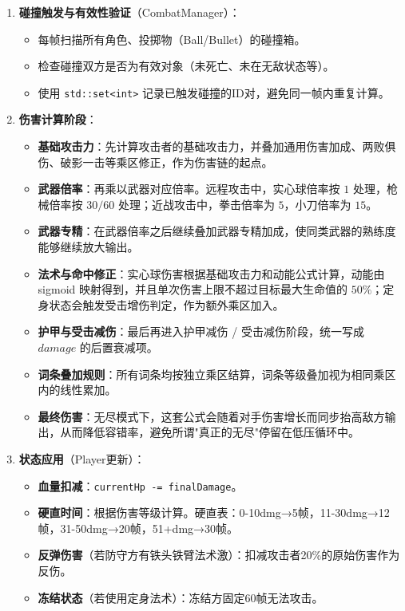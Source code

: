 ﻿\documentclass[utf8]{ctexart}
\begin{document}
\begin{enumerate}
  \item \textbf{碰撞触发与有效性验证}（CombatManager）：
  \begin{itemize}
    \item 每帧扫描所有角色、投掷物（Ball/Bullet）的碰撞箱。
    \item 检查碰撞双方是否为有效对象（未死亡、未在无敌状态等）。
    \item 使用 \texttt{std::set<int>} 记录已触发碰撞的ID对，避免同一帧内重复计算。
  \end{itemize}

  \item \textbf{伤害计算阶段}：
  \begin{itemize}
    \item \textbf{基础攻击力}：先计算攻击者的基础攻击力，并叠加通用伤害加成、两败俱伤、破影一击等乘区修正，作为伤害链的起点。
    \item \textbf{武器倍率}：再乘以武器对应倍率。远程攻击中，实心球倍率按 $1$ 处理，枪械倍率按 $30/60$ 处理；近战攻击中，拳击倍率为 $5$，小刀倍率为 $15$。
    \item \textbf{武器专精}：在武器倍率之后继续叠加武器专精加成，使同类武器的熟练度能够继续放大输出。
    \item \textbf{法术与命中修正}：实心球伤害根据基础攻击力和动能公式计算，动能由 sigmoid 映射得到，并且单次伤害上限不超过目标最大生命值的 $50\%$；定身状态会触发受击增伤判定，作为额外乘区加入。
    \item \textbf{护甲与受击减伤}：最后再进入护甲减伤 / 受击减伤阶段，统一写成 $damage$ 的后置衰减项。
    \item \textbf{词条叠加规则}：所有词条均按独立乘区结算，词条等级叠加视为相同乘区内的线性累加。
    \item \textbf{最终伤害}：无尽模式下，这套公式会随着对手伤害增长而同步抬高敌方输出，从而降低容错率，避免所谓"真正的无尽"停留在低压循环中。
  \end{itemize}

  \item \textbf{状态应用}（Player更新）：
  \begin{itemize}
    \item \textbf{血量扣减}：\texttt{currentHp -= finalDamage}。
    \item \textbf{硬直时间}：根据伤害等级计算。硬直表：0-10dmg→5帧，11-30dmg→12帧，31-50dmg→20帧，51+dmg→30帧。
    \item \textbf{反弹伤害}（若防守方有铁头铁臂法术激）：扣减攻击者20\%的原始伤害作为反伤。
    \item \textbf{冻结状态}（若使用定身法术）：冻结方固定60帧无法攻击。
  \end{itemize}


\end{enumerate}
\end{document}
